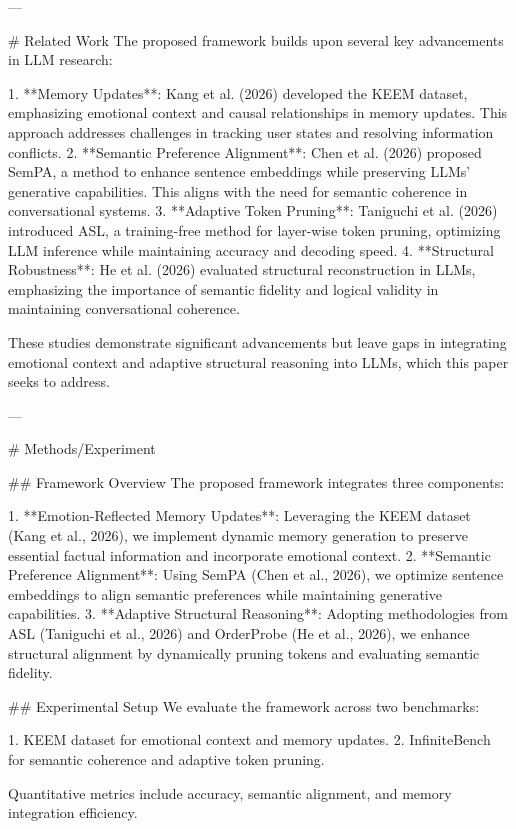 ---

# Related Work  
The proposed framework builds upon several key advancements in LLM research:  

1. **Memory Updates**: Kang et al. (2026) developed the KEEM dataset, emphasizing emotional context and causal relationships in memory updates. This approach addresses challenges in tracking user states and resolving information conflicts.  
2. **Semantic Preference Alignment**: Chen et al. (2026) proposed SemPA, a method to enhance sentence embeddings while preserving LLMs' generative capabilities. This aligns with the need for semantic coherence in conversational systems.  
3. **Adaptive Token Pruning**: Taniguchi et al. (2026) introduced ASL, a training-free method for layer-wise token pruning, optimizing LLM inference while maintaining accuracy and decoding speed.  
4. **Structural Robustness**: He et al. (2026) evaluated structural reconstruction in LLMs, emphasizing the importance of semantic fidelity and logical validity in maintaining conversational coherence.  

These studies demonstrate significant advancements but leave gaps in integrating emotional context and adaptive structural reasoning into LLMs, which this paper seeks to address.

---

# Methods/Experiment  

## Framework Overview  
The proposed framework integrates three components:  

1. **Emotion-Reflected Memory Updates**: Leveraging the KEEM dataset (Kang et al., 2026), we implement dynamic memory generation to preserve essential factual information and incorporate emotional context.  
2. **Semantic Preference Alignment**: Using SemPA (Chen et al., 2026), we optimize sentence embeddings to align semantic preferences while maintaining generative capabilities.  
3. **Adaptive Structural Reasoning**: Adopting methodologies from ASL (Taniguchi et al., 2026) and OrderProbe (He et al., 2026), we enhance structural alignment by dynamically pruning tokens and evaluating semantic fidelity.  

## Experimental Setup  
We evaluate the framework across two benchmarks:  

1. KEEM dataset for emotional context and memory updates.  
2. InfiniteBench for semantic coherence and adaptive token pruning.  

Quantitative metrics include accuracy, semantic alignment, and memory integration efficiency.  

